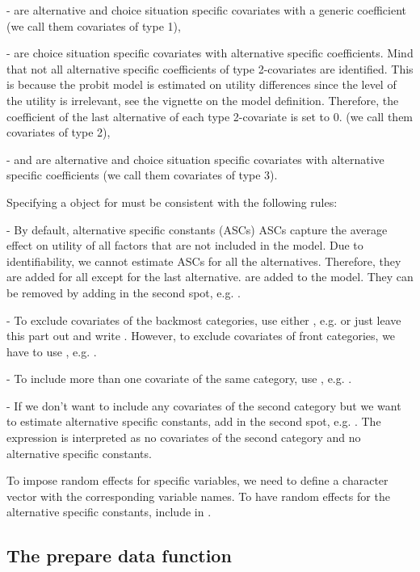 \documentclass[article]{jss}
\begin{document}
-  are alternative and choice situation specific covariates with a generic coefficient (we call them covariates of type 1),

-  are choice situation specific covariates with alternative specific coefficients. Mind that not all alternative specific coefficients of type 2-covariates are identified. This is because the probit model is estimated on utility differences since the level of the utility is irrelevant, see the vignette on the model definition. Therefore, the coefficient of the last alternative of each type 2-covariate is set to 0. (we call them covariates of type 2),

- and  are alternative and choice situation specific covariates with
alternative specific coefficients (we call them covariates of type 3).

Specifying a  object for  must be consistent with the following rules:

- By default, alternative specific constants (ASCs) ASCs capture the average effect on utility of all factors that are not included in the model. Due to identifiability, we cannot estimate ASCs for all the alternatives. Therefore, they are added for all except for the last alternative. are added to the model. They can be removed by adding  in the second spot, e.g. .

- To exclude covariates of the backmost categories, use either , e.g.  or just leave this part out and write . However, to exclude covariates of front categories, we have to use , e.g. .

- To include more than one covariate of the same category, use \code{+}, e.g. .

- If we don't want to include any covariates of the second category but we want to estimate alternative specific constants, add  in the second spot, e.g. . The expression  is interpreted as no covariates of the second category and no alternative specific constants.

To impose random effects for specific variables, we need to define a character vector  with the corresponding variable names. To have random effects for the alternative specific constants, include  in .

\subsection{The prepare data function} \label{subsec:prepare_data}
\end{document}
